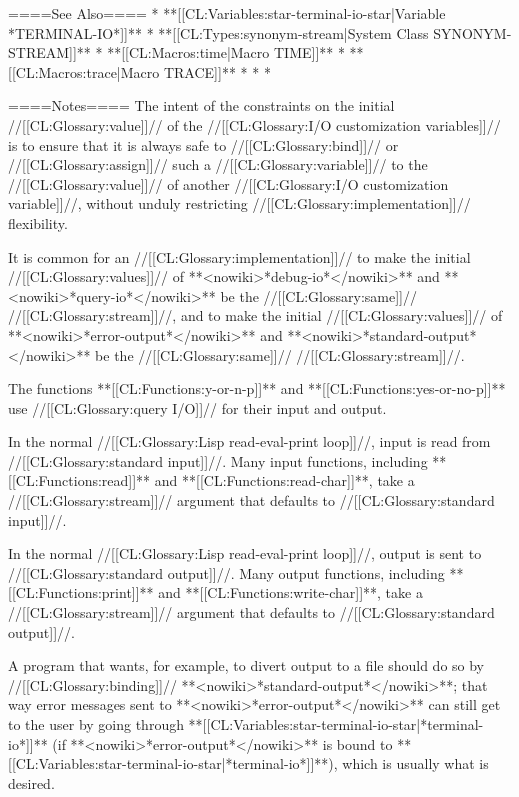 ====See Also====
  * **[[CL:Variables:star-terminal-io-star|Variable *TERMINAL-IO*]]**
  * **[[CL:Types:synonym-stream|System Class SYNONYM-STREAM]]**
  * **[[CL:Macros:time|Macro TIME]]**
  * **[[CL:Macros:trace|Macro TRACE]]**
  * {\chapref\Conditions}
  * {\chapref\Reader}
  * {\chapref\Printer}

====Notes====
The intent of the constraints on the initial //[[CL:Glossary:value]]// of the //[[CL:Glossary:I/O customization variables]]// is to ensure that it is always safe to //[[CL:Glossary:bind]]// or //[[CL:Glossary:assign]]// such a //[[CL:Glossary:variable]]// to the //[[CL:Glossary:value]]// of another //[[CL:Glossary:I/O customization variable]]//, without unduly restricting //[[CL:Glossary:implementation]]// flexibility.

It is common for an //[[CL:Glossary:implementation]]// to make the initial //[[CL:Glossary:values]]// of **<nowiki>*debug-io*</nowiki>** and **<nowiki>*query-io*</nowiki>** be the //[[CL:Glossary:same]]// //[[CL:Glossary:stream]]//, and to make the initial //[[CL:Glossary:values]]// of **<nowiki>*error-output*</nowiki>** and **<nowiki>*standard-output*</nowiki>** be the //[[CL:Glossary:same]]// //[[CL:Glossary:stream]]//.

The functions **[[CL:Functions:y-or-n-p]]** and **[[CL:Functions:yes-or-no-p]]** use //[[CL:Glossary:query I/O]]// for their input and output.

In the normal //[[CL:Glossary:Lisp read-eval-print loop]]//, input is read from //[[CL:Glossary:standard input]]//. Many input functions, including **[[CL:Functions:read]]** and **[[CL:Functions:read-char]]**, take a //[[CL:Glossary:stream]]// argument that defaults to //[[CL:Glossary:standard input]]//.

In the normal //[[CL:Glossary:Lisp read-eval-print loop]]//, output is sent to //[[CL:Glossary:standard output]]//. Many output functions, including **[[CL:Functions:print]]** and **[[CL:Functions:write-char]]**, take a //[[CL:Glossary:stream]]// argument that defaults to //[[CL:Glossary:standard output]]//.

A program that wants, for example, to divert output to a file should do so by //[[CL:Glossary:binding]]// **<nowiki>*standard-output*</nowiki>**; that way error messages sent to **<nowiki>*error-output*</nowiki>** can still get to the user by going through **[[CL:Variables:star-terminal-io-star|*terminal-io*]]** (if **<nowiki>*error-output*</nowiki>** is bound to **[[CL:Variables:star-terminal-io-star|*terminal-io*]]**), which is usually what is desired.

 
